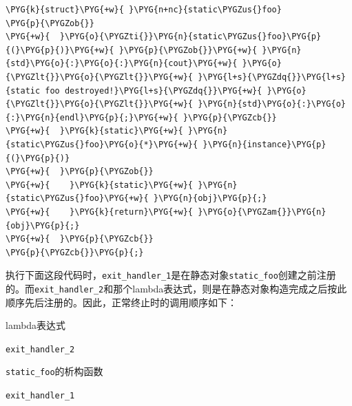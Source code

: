 \begin{codeblockbg}
\begin{Verbatim}[commandchars=\\\{\},breaklines=true,breakanywhere=true,fontsize=\codefont,xleftmargin=17bp]
\PYG{k}{struct}\PYG{+w}{ }\PYG{n+nc}{static\PYGZus{}foo}
\PYG{p}{\PYGZob{}}
\PYG{+w}{  }\PYG{o}{\PYGZti{}}\PYG{n}{static\PYGZus{}foo}\PYG{p}{(}\PYG{p}{)}\PYG{+w}{ }\PYG{p}{\PYGZob{}}\PYG{+w}{ }\PYG{n}{std}\PYG{o}{:}\PYG{o}{:}\PYG{n}{cout}\PYG{+w}{ }\PYG{o}{\PYGZlt{}}\PYG{o}{\PYGZlt{}}\PYG{+w}{ }\PYG{l+s}{\PYGZdq{}}\PYG{l+s}{static foo destroyed!}\PYG{l+s}{\PYGZdq{}}\PYG{+w}{ }\PYG{o}{\PYGZlt{}}\PYG{o}{\PYGZlt{}}\PYG{+w}{ }\PYG{n}{std}\PYG{o}{:}\PYG{o}{:}\PYG{n}{endl}\PYG{p}{;}\PYG{+w}{ }\PYG{p}{\PYGZcb{}}
\PYG{+w}{  }\PYG{k}{static}\PYG{+w}{ }\PYG{n}{static\PYGZus{}foo}\PYG{o}{*}\PYG{+w}{ }\PYG{n}{instance}\PYG{p}{(}\PYG{p}{)}
\PYG{+w}{  }\PYG{p}{\PYGZob{}}
\PYG{+w}{    }\PYG{k}{static}\PYG{+w}{ }\PYG{n}{static\PYGZus{}foo}\PYG{+w}{ }\PYG{n}{obj}\PYG{p}{;}
\PYG{+w}{    }\PYG{k}{return}\PYG{+w}{ }\PYG{o}{\PYGZam{}}\PYG{n}{obj}\PYG{p}{;}
\PYG{+w}{  }\PYG{p}{\PYGZcb{}}
\PYG{p}{\PYGZcb{}}\PYG{p}{;}
\end{Verbatim}
\end{codeblockbg}



执行下面这段代码时，\texttt{exit\_\allowbreak{}handler\_\allowbreak{}1}是在静态对象\texttt{static\_\allowbreak{}foo}创建之前注册的。而\texttt{exit\_\allowbreak{}handler\_\allowbreak{}2}和那个lambda表达式，则是在静态对象构造完成之后按此顺序先后注册的。因此，正常终止时的调用顺序如下：



lambda表达式



\texttt{exit\_\allowbreak{}handler\_\allowbreak{}2}



\texttt{static\_\allowbreak{}foo}的析构函数



\texttt{exit\_\allowbreak{}handler\_\allowbreak{}1}



